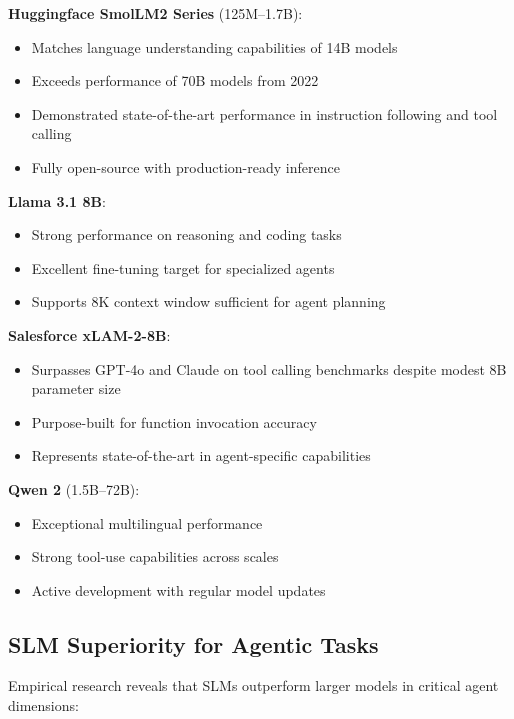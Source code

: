\documentclass[11pt,a4paper]{article}
\begin{document}
    \textbf{Huggingface SmolLM2 Series} (125M--1.7B): \cite{nvidia2025}
    \begin{itemize}
        \item Matches language understanding capabilities of 14B models
        \item Exceeds performance of 70B models from 2022
        \item Demonstrated state-of-the-art performance in instruction following and tool calling
        \item Fully open-source with production-ready inference

    \end{itemize}
    \textbf{Llama 3.1 8B}: \cite{thirdeye2025}
    \begin{itemize}
        \item Strong performance on reasoning and coding tasks
        \item Excellent fine-tuning target for specialized agents
        \item Supports 8K context window sufficient for agent planning
    \end{itemize}
    \textbf{Salesforce xLAM-2-8B}: \cite{nvidia2025}
    \begin{itemize}
        \item Surpasses GPT-4o and Claude on tool calling benchmarks despite modest 8B parameter size
        \item Purpose-built for function invocation accuracy
        \item Represents state-of-the-art in agent-specific capabilities
    \end{itemize}
    \textbf{Qwen 2} (1.5B--72B): \cite{belcak2025}
    \begin{itemize}
        \item Exceptional multilingual performance
        \item Strong tool-use capabilities across scales
        \item Active development with regular model updates
    \end{itemize}

\subsection{SLM Superiority for Agentic Tasks}
Empirical research reveals that SLMs outperform larger models in critical agent dimensions: \cite{nvidia2025}
\end{document}
